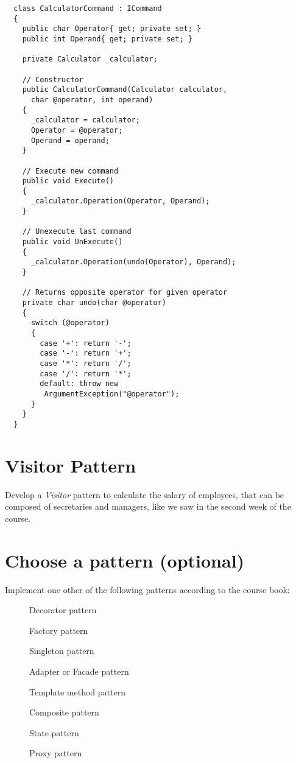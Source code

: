 \documentclass{article}
\begin{document}
 \begin{lstlisting}
  class CalculatorCommand : ICommand
  {
    public char Operator{ get; private set; }
    public int Operand{ get; private set; }

    private Calculator _calculator;
 
    // Constructor
    public CalculatorCommand(Calculator calculator,
      char @operator, int operand)
    {
      _calculator = calculator;
      Operator = @operator;
      Operand = operand;
    }
 
    // Execute new command
    public void Execute()
    {
      _calculator.Operation(Operator, Operand);
    }
 
    // Unexecute last command
    public void UnExecute()
    {
      _calculator.Operation(undo(Operator), Operand);
    }
 
    // Returns opposite operator for given operator
    private char undo(char @operator)
    {
      switch (@operator)
      {
        case '+': return '-';
        case '-': return '+';
        case '*': return '/';
        case '/': return '*';
        default: throw new
         ArgumentException("@operator");
      }
    }
  }
\end{lstlisting}
 



\section{Visitor Pattern}
Develop a \emph{Visitor} pattern to calculate the salary of employees, that
  can be composed of secretaries and managers,
  like we saw in the second week of the course.
  
  \vspace{0.3cm}


\section{Choose a pattern (optional)}
Implement one other of the following patterns according to the course book:

    \begin{description}
      \item[] Decorator pattern
      \item[] Factory pattern
      \item[] Singleton pattern
      \item[] Adapter or Facade pattern
      \item[] Template method pattern
      \item[] Composite pattern
      \item[] State pattern
      \item[] Proxy pattern
    \end{description}
\end{document}
